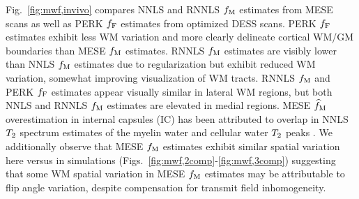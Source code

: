 Fig.~\ref{fig:mwf,invivo} compares 
NNLS and RNNLS $f_\mathrm{M}$ estimates from MESE scans
as well as PERK $f_{\mathrm{F}}$ estimates from optimized DESS scans.
PERK $f_{\mathrm{F}}$ estimates exhibit less WM variation
and more clearly delineate cortical WM/GM boundaries
than MESE $f_\mathrm{M}$ estimates.
RNNLS $f_\mathrm{M}$ estimates are visibly lower than NNLS $f_\mathrm{M}$ estimates
due to regularization
but exhibit reduced WM variation,
somewhat improving visualization of WM tracts. 
RNNLS $f_\mathrm{M}$ and PERK $f_{\mathrm{F}}$ estimates 
appear visually similar in lateral WM regions,
but both NNLS and RNNLS $f_\mathrm{M}$ estimates are elevated in medial regions.
MESE $\widehat{f}_\mathrm{M}$ overestimation in internal capsules (IC)
has been attributed 
to overlap in NNLS $T_2$ spectrum estimates 
of the myelin water and cellular water $T_2$ peaks \cite{zhang:15:com}.
We additionally observe
that MESE $f_\mathrm{M}$ estimates exhibit similar spatial variation
here versus in simulations 
(\cf Figs.~\ref{fig:mwf,2comp}-\ref{fig:mwf,3comp})
suggesting that some WM spatial variation
in MESE $f_\mathrm{M}$ estimates
may be attributable to flip angle variation,
despite compensation for transmit field inhomogeneity.

